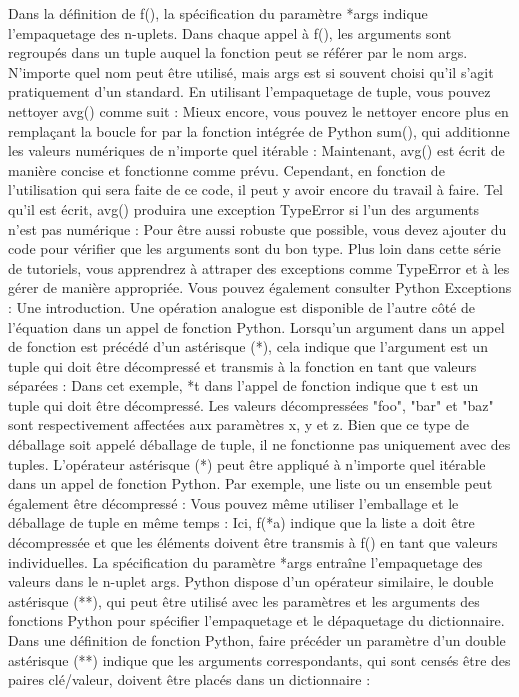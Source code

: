 Dans la définition de f(), la spécification du paramètre *args indique l'empaquetage des n-uplets.  Dans chaque appel à f(), les arguments sont regroupés dans un tuple auquel la fonction peut se référer par le nom args.  N'importe quel nom peut être utilisé, mais args est si souvent choisi qu'il s'agit pratiquement d'un standard.
En utilisant l'empaquetage de tuple, vous pouvez nettoyer avg() comme suit :
Mieux encore, vous pouvez le nettoyer encore plus en remplaçant la boucle for par la fonction intégrée de Python sum(), qui additionne les valeurs numériques de n'importe quel itérable :
Maintenant, avg() est écrit de manière concise et fonctionne comme prévu.
Cependant, en fonction de l'utilisation qui sera faite de ce code, il peut y avoir encore du travail à faire.  Tel qu'il est écrit, avg() produira une exception TypeError si l'un des arguments n'est pas numérique :
Pour être aussi robuste que possible, vous devez ajouter du code pour vérifier que les arguments sont du bon type.  Plus loin dans cette série de tutoriels, vous apprendrez à attraper des exceptions comme TypeError et à les gérer de manière appropriée.  Vous pouvez également consulter Python Exceptions :  Une introduction.
Une opération analogue est disponible de l'autre côté de l'équation dans un appel de fonction Python. Lorsqu'un argument dans un appel de fonction est précédé d'un astérisque (*), cela indique que l'argument est un tuple qui doit être décompressé et transmis à la fonction en tant que valeurs séparées :
Dans cet exemple, *t dans l'appel de fonction indique que t est un tuple qui doit être décompressé.  Les valeurs décompressées "foo", "bar" et "baz" sont respectivement affectées aux paramètres x, y et z.
Bien que ce type de déballage soit appelé déballage de tuple, il ne fonctionne pas uniquement avec des tuples.  L'opérateur astérisque (*) peut être appliqué à n'importe quel itérable dans un appel de fonction Python.  Par exemple, une liste ou un ensemble peut également être décompressé :
Vous pouvez même utiliser l'emballage et le déballage de tuple en même temps :
Ici, f(*a) indique que la liste a doit être décompressée et que les éléments doivent être transmis à f() en tant que valeurs individuelles.  La spécification du paramètre *args entraîne l'empaquetage des valeurs dans le n-uplet args.
Python dispose d'un opérateur similaire, le double astérisque (**), qui peut être utilisé avec les paramètres et les arguments des fonctions Python pour spécifier l'empaquetage et le dépaquetage du dictionnaire. Dans une définition de fonction Python, faire précéder un paramètre d'un double astérisque (**) indique que les arguments correspondants, qui sont censés être des paires clé/valeur, doivent être placés dans un dictionnaire :
